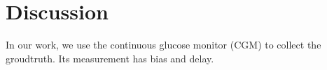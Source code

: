 
\section{Discussion}
\label{sec:conclusion}
In our work, we use the continuous glucose monitor (CGM) to collect the groudtruth. Its measurement has bias and delay. 